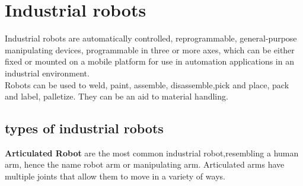 \section{Industrial robots}

Industrial robots are automatically controlled, 
reprogrammable, general-purpose manipulating devices, 
programmable in three or more axes, 
which can be either fixed or mounted on a mobile 
platform for use in automation applications in an industrial 
environment.\cite{dagalakis1999industrial}\\
Robots can be used to weld, paint, assemble, 
disassemble,pick and place, pack and label, 
palletize.\cite{hagele2016industrial}
They can be an aid to material handling.\cite{hagele2016industrial}

\subsection{types of industrial robots}

\textbf{Articulated Robot} are the most common industrial 
robot,resembling a human arm, hence the name robot arm or 
manipulating arm. Articulated arms have multiple joints that 
allow them to move in a variety of ways.\cite{hagele2016industrial}